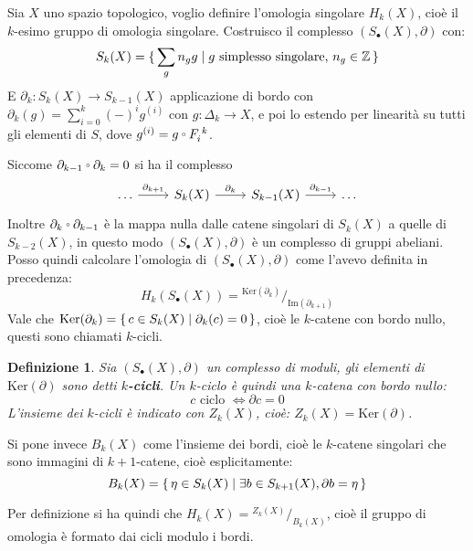\documentclass[10pt, twoside=false, x11names]{scrbook}
\newtheorem{definition}[theorem]{Definizione}
\newcommand{\Z}{\mathbb{Z}}
\newcommand{\im}[1]{\mathrm{Im}( #1 )}
\renewcommand{\ker}[1]{\mathrm{Ker}( #1)}
\newcommand*\quot[2]{{^{\textstyle #1}\big/_{\textstyle #2}}}
\let\latexcirc=\circ
\newcommand{\ccirc}{\mathbin{\mathchoice
  {\xcirc\scriptstyle}
  {\xcirc\scriptstyle}
  {\xcirc\scriptscriptstyle}
  {\xcirc\scriptscriptstyle}
}}
\newcommand{\xcirc}[1]{\vcenter{\hbox{$#1\latexcirc$}}}
\let\circ\ccirc
\begin{document}


Sia $ X $ uno spazio topologico, voglio definire l'omologia singolare $ H_k(X) $, cioè il $ k $-esimo gruppo di omologia
singolare. Costruisco il complesso $ (S_\bullet(X), \partial) $ con:
\[
  S_k(X) = \set{ \sum_g n_g g | g \text{ simplesso singolare, } n_g \in \Z }
\]
E $ \partial_k : S_k(X) \to S_{k-1}(X) $ applicazione di bordo con $ \partial_k(g) = \sum_{i=0}^k(-)^ig^{(i)} $ con $ g: \Delta_k \to X $, e poi lo estendo per
linearità su tutti gli elementi di $ S $, dove $ g^{(i)} = g \circ F_i^{\; k} $.

Siccome $ \partial_{k-1} \circ \partial_k = 0 $ si ha il complesso
\[
  \begin{tikzcd}
    \dots \arrow{r}{\partial_{k+1}} & S_k(X) \arrow{r}{\partial_k} & S_{k-1}(X) \arrow{r}{\partial_{k-1}} & \dots
  \end{tikzcd}
\]
Inoltre $ \partial_k \circ \partial_{k-1} $ è la mappa nulla dalle catene singolari di $ S_k(X) $
a quelle di $ S_{k-2}(X) $, in questo modo $ (S_\bullet(X), \partial) $ è un complesso di gruppi abeliani.
Posso quindi calcolare l'omologia di $ (S_\bullet(X),\partial) $ come l'avevo definita
in precedenza:
\[
  H_k(S_\bullet(X)) = \quot{\ker{\partial_k}}{\im{\partial_{k+1}}}
\]
Vale che $ \ker{\partial_k} = \set{c \in S_k(X) | \partial_k(c) = 0} $, cioè le $ k $-catene con
bordo nullo, questi sono chiamati $ k $-cicli.

\begin{definition}
  Sia $ (S_\bullet(X),\partial) $ un complesso di moduli, gli elementi di $ \ker{\partial} $ sono detti
  \textbf{$ k $-cicli}. Un $ k $-ciclo è quindi una $ k $-catena
  con bordo nullo:
  \[
    c \text{ ciclo } \Leftrightarrow \partial c = 0
  \]
  L'insieme dei $ k $-cicli è indicato con $ Z_k(X) $, cioè: $ Z_k(X) = \ker{\partial} $.
\end{definition}

Si pone invece $ B_k(X) $ come l'insieme dei bordi, cioè le $ k $-catene singolari
che sono immagini di $ k+1 $-catene, cioè esplicitamente:
\[
  B_k(X) = \set{\eta \in S_k(X) | \exists b \in S_{k+1}(X), \partial b = \eta}
\]

Per definizione si ha quindi che $ H_k(X) = \quot{Z_k(X)}{B_k(X)} $, cioè il gruppo
di omologia è formato dai cicli modulo i bordi.
\end{document}
